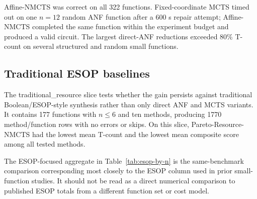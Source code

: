 \documentclass[11pt]{article}
\newcommand{\affinemethod}{Affine-NMCTS}
\newcommand{\paretomethod}{Pareto-Resource-NMCTS}
\newcommand{\traditionaldataset}{traditional\_resource}
\begin{document}
\affinemethod{} was correct on all 322 functions.  Fixed-coordinate MCTS timed
out on one $n=12$ random ANF function after a 600 s repair attempt;
\affinemethod{} completed the same function within the experiment budget and
produced a valid circuit.
The largest direct-ANF reductions exceeded 80\% T-count on several structured
and random small functions.

\subsection{Traditional ESOP baselines}

The \traditionaldataset{} slice tests whether the gain persists against
traditional Boolean/ESOP-style synthesis rather than only direct ANF and MCTS
variants.  It contains 177 functions with $n\leq 6$ and ten methods,
producing 1770 method/function rows with no errors or skips.  On this slice,
\paretomethod{} had the lowest mean T-count and the lowest mean composite
score among all tested methods.

\begin{table}[t]
\centering
\small
\caption{Mean logical resources on the \traditionaldataset{} slice.  ESOP MILP
is a time-limited weighted ESOP optimization over candidate cubes.}
\label{tab:traditional-resources}

\end{table}

The ESOP-focused aggregate in Table~\ref{tab:esop-by-n} is the same-benchmark
comparison corresponding most closely to the ESOP column used in prior
small-function studies.  It should not be read as a direct numerical
comparison to published ESOP totals from a different function set or cost
model.

\begin{table}[t]
\centering
\scriptsize
\caption{ESOP-centered aggregate comparison by variable count on the matched
$n\leq 6$ benchmark.  T/C/A denotes total T-count, total CNOT count, and summed
peak-ancilla count across functions in the group.  Negative changes favor
\paretomethod{}.}
\label{tab:esop-by-n}

\end{table}
\end{document}
